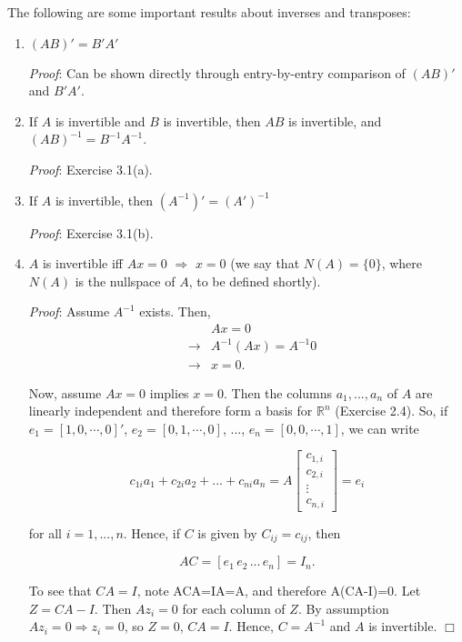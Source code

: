 \documentclass[12pt,oneside]{article}
\begin{document}
The following are some important results about inverses and transposes:
\begin{enumerate}
\item $(AB)' = B' A'$

\emph{Proof}: Can be shown directly through entry-by-entry comparison of $(AB)'$ and $B'A'$.

\item If $A$ is invertible and $B$ is invertible, then $AB$ is invertible, and $(AB)^{-1} = B^{-1}A^{-1}$.

\emph{Proof}: Exercise 3.1(a).

\item If $A$ is invertible, then $(A^{-1})' = (A')^{-1}$

\emph{Proof}: Exercise 3.1(b).

\item $A$ is invertible iff  $Ax = 0$
  $\Longrightarrow$ $x = 0$ (we say that $N(A) = \{0\}$, where $N(A)$
  is the nullspace of $A$, to be defined shortly).

\emph{Proof}: Assume $A^{-1}$ exists.  Then,
\begin{eqnarray*}&& Ax = 0 \\ &\rightarrow& A^{-1}(Ax) = A^{-1}0 \\ &\rightarrow& x = 0. \end{eqnarray*}

Now, assume $Ax = 0$ implies $x=0$.  Then the columns ${a_1,...,a_n}$ of $A$ are linearly independent and therefore form a basis for $\mathbb{R}^{n}$ (Exercise 2.4).  So, if \\ $e_1 = \left[ 1 , 0 , \cdots , 0\right]'$, $ e_2 = \left[ 0, 1, \cdots, 0 \right]$, ..., $e_n = \left[ 0, 0, \cdots, 1 \right]$, we can write

\[c_{1i}a_1+c_{2i}a_2+...+c_{ni}a_n = A \left[ \begin{array} {c} c_{1,i} \\ c_{2,i} \\ \vdots \\ c_{n,i} \end{array} \right] = e_i \]

for all $i=1,...,n$.  Hence, if $C$ is given by $C_{ij} = c_{ij}$, then

\[AC = [e_1 \, e_2 \, ... \, e_n] = I_n. \]

To see that \(CA=I\), note ACA=IA=A, and therefore A(CA-I)=0. Let \(Z=CA-I\). Then \(Az_i=0\) for each column of \(Z\). By assumption \(Az_i=0 \Rightarrow z_i=0\), so \(Z=0\), \(CA=I\). Hence, $C = A^{-1}$ and \(A\) is invertible. $\Box$



\end{enumerate}
\end{document}
